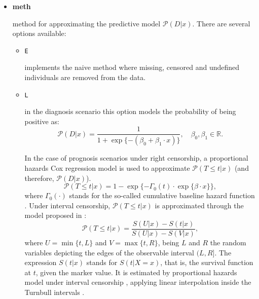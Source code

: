 \begin{itemize}
\item{\textbf{meth}} {method for approximating the predictive model ${\mathcal{P}}(D |x)$. There are several options available: 
\begin{itemize}
\renewcommand{\labelitemii}{-}
\item{\texttt{E}} {implements the naive method where missing, censored and undefined individuals are removed from the data.

}  
\item{\texttt{L}} {in the diagnosis scenario this option models the probability of being positive as: $${\mathcal{P}}(D | x) = \frac{1}{1 + \exp \{-(\beta_0 + \beta_1 \cdot x)\}},\quad \beta_0, \beta_1 \in \mathbb{R}.$$ 

In the case of prognosis scenarios under right censorship, a proportional hazards Cox regression model is used to approximate ${\mathcal{P}}(T \leq t | x)$ (and therefore, ${\mathcal{P}}(D | x)$). $${\mathcal{P}}(T \leq t | x) = 1 - \exp \{ -\Gamma_0(t) \cdot \exp \{ \beta \cdot x \}\},$$ where $\Gamma_0(\cdot)$ stands for the so-called cumulative baseline hazard function \citep{Cox1972}. Under interval censorship, ${\mathcal{P}}(T \leq t | x)$ is approximated through the model proposed in \citet{Diaz-Coto2020}:
 \begin{equation}
{\mathcal{P}} (T \leq t | x) =  \frac{S(U|x) - S(t|x) }{S(U|x) - S(V|x)}, \label{sdc1}
\end{equation}
where $U = \min{\{t, L\}}$ and $V = \max {\{t, R\}}$, being $L$ and $R$ the random variables depicting the edges of the observable interval $(L, R]$. 
The expression $S(t|x)$ stands for $S(t|X=x)$, that is, the survival function at $t$, given the marker value. 
It is estimated by proportional hazards model under interval censorship \citep{ Finkelstein1986}, applying linear interpolation inside the Turnbull intervals \citep{Turnbull1976}. 

}
\end{itemize}}
\end{itemize}
